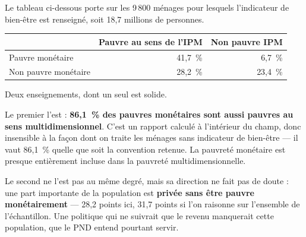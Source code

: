 \documentclass[11pt,a4paper]{article}
\begin{document}
Le tableau ci-dessous porte sur les 9\,800 ménages pour lesquels l'indicateur de bien-être est
renseigné, soit 18,7 millions de personnes.

\begin{center}
\begin{tabular}{@{}lrr@{}}
\toprule
& \textbf{Pauvre au sens de l'IPM} & \textbf{Non pauvre IPM} \\
\midrule
Pauvre monétaire & 41,7~\% & 6,7~\% \\
Non pauvre monétaire & 28,2~\% & 23,4~\% \\
\bottomrule
\end{tabular}
\end{center}

Deux enseignements, dont un seul est solide.

Le premier l'est : \textbf{86,1~\% des pauvres monétaires sont aussi pauvres au sens
multidimensionnel}. C'est un rapport calculé à l'intérieur du champ, donc insensible à la façon
dont on traite les ménages sans indicateur de bien-être --- il vaut 86,1~\% quelle que soit la
convention retenue. La pauvreté monétaire est presque entièrement incluse dans la pauvreté
multidimensionnelle.

Le second ne l'est pas au même degré, mais sa direction ne fait pas de doute : une part importante
de la population est \textbf{privée sans être pauvre monétairement} --- 28,2 points ici, 31,7
points si l'on raisonne sur l'ensemble de l'échantillon. Une politique qui ne suivrait que le
revenu manquerait cette population, que le PND entend pourtant servir.
\end{document}
